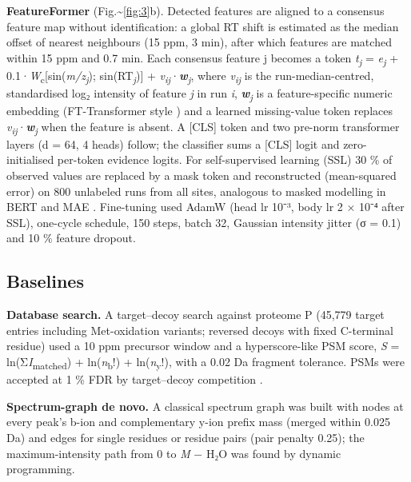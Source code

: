 \documentclass{sn-preview}
\begin{document}
\textbf{FeatureFormer} (Fig.\textasciitilde{}\ref{fig:3}b). Detected features are aligned to a consensus feature map without identification: a global RT shift is estimated as the median offset of nearest neighbours (15 ppm, 3 min), after which features are matched within 15 ppm and 0.7 min. Each consensus feature j becomes a token \emph{t}\textsubscript{\emph{j}} = \emph{e}\textsubscript{\emph{j}} + 0.1·\emph{W}\textsubscript{c}{[}sin(\emph{m/z}\textsubscript{\emph{j}}); sin(RT\textsubscript{\emph{j}}){]} + \emph{v}\textsubscript{\emph{ij}}·\textbf{\emph{w}}\textsubscript{\emph{j}}, where \emph{v}\textsubscript{\emph{ij}} is the run-median-centred, standardised log₂ intensity of feature \emph{j} in run \emph{i}, \textbf{\emph{w}}\textsubscript{\emph{j}} is a feature-specific numeric embedding (FT-Transformer style \cite{gorishniy2021}) and a learned missing-value token replaces \emph{v}\textsubscript{\emph{ij}}·\textbf{\emph{w}}\textsubscript{\emph{j}} when the feature is absent. A {[}CLS{]} token and two pre-norm transformer layers (d = 64, 4 heads) follow; the classifier sums a {[}CLS{]} logit and zero-initialised per-token evidence logits. For self-supervised learning (SSL) 30 \% of observed values are replaced by a mask token and reconstructed (mean-squared error) on 800 unlabeled runs from all sites, analogous to masked modelling in BERT and MAE \cite{devlin2019,he2022}. Fine-tuning used AdamW (head lr 10⁻³, body lr 2 × 10⁻⁴ after SSL), one-cycle schedule, 150 steps, batch 32, Gaussian intensity jitter (σ = 0.1) and 10 \% feature dropout.

\subsection{Baselines}

\textbf{Database search.} A target--decoy search against proteome P (45,779 target entries including Met-oxidation variants; reversed decoys with fixed C-terminal residue) used a 10 ppm precursor window and a hyperscore-like PSM score, \emph{S} = ln(Σ\emph{I}\textsubscript{matched}) + ln(\emph{n}\textsubscript{b}!) + ln(\emph{n}\textsubscript{y}!), with a 0.02 Da fragment tolerance. PSMs were accepted at 1 \% FDR by target--decoy competition \cite{elias2007}.

\textbf{Spectrum-graph de novo.} A classical spectrum graph \cite{dancik1999,ma2003} was built with nodes at every peak's b-ion and complementary y-ion prefix mass (merged within 0.025 Da) and edges for single residues or residue pairs (pair penalty 0.25); the maximum-intensity path from 0 to \emph{M} − H₂O was found by dynamic programming.
\end{document}

